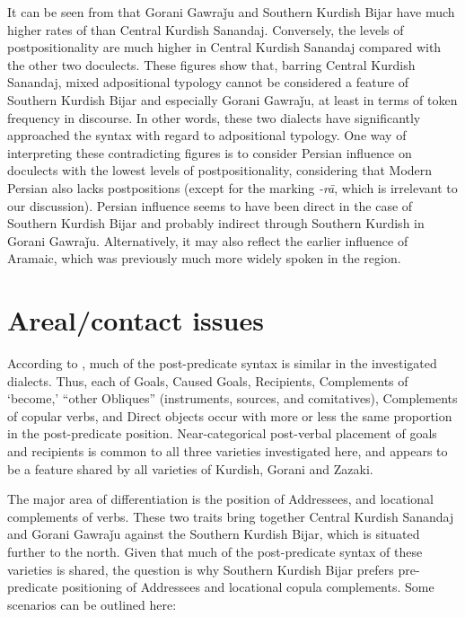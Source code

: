 \documentclass[output=paper,colorlinks,citecolor=brown]{langscibook}
\begin{document}
\begin{sloppypar}
\largerpage
It can be seen from  that Gorani Gawraǰu and Southern Kurdish Bijar have much higher rates of  than Central Kurdish Sanandaj. Conversely, the levels of postpositionality are much higher in Central Kurdish Sanandaj compared with the other two doculects. These figures show that, barring Central Kurdish Sanandaj, mixed adpositional typology cannot be considered a feature of Southern Kurdish Bijar and especially Gorani Gawraǰu, at least in terms of token frequency in discourse. In other words, these two dialects have significantly approached the  syntax with regard to adpositional typology. One way of interpreting these contradicting figures is to consider Persian influence on doculects with the lowest levels of postpositionality, considering that Modern Persian also lacks postpositions (except for the  marking \textit{-rā}, which is irrelevant to our discussion).  Persian influence seems to have been direct in the case of Southern Kurdish Bijar and probably indirect through Southern Kurdish in Gorani Gawraǰu. Alternatively, it may also reflect the earlier influence of  Aramaic, which was previously much more widely spoken in the region.

\section{Areal/contact issues} \label{MGKC:sec.areal}

According to , much of the post-predicate syntax is similar in the investigated dialects. Thus, each of Goals, Caused Goals, Recipients, Complements of `become,' “other Obliques” (instruments, sources, and comitatives), Complements of copular verbs, and Direct objects occur with more or less the same proportion in the post-predicate position. Near-categorical post-verbal placement of goals and recipients is common to all three varieties investigated here, and appears to be a feature shared by all varieties of Kurdish, Gorani and Zazaki.

The major area of differentiation is the position of Addressees, and locational complements of  verbs. These two traits bring together Central Kurdish Sanandaj and Gorani Gawraǰu against the Southern Kurdish Bijar, which is situated further to the north. Given that much of the post-predicate syntax of these varieties is shared, the question is why Southern Kurdish Bijar prefers pre-predicate positioning of Addressees and locational copula complements. Some scenarios can be outlined here:


\end{sloppypar}
\end{document}
